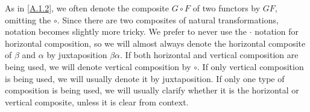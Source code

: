 \begin{notation}\label{A.1.12}
    As in \cref{A.1.2}, we often denote the composite $G\circ F$ of two functors by $GF$, omitting the $\circ$. Since there are two composites of natural transformations, notation becomes slightly more tricky. We prefer to never use the $\cdot$ notation for horizontal composition, so we will almost always denote the horizontal composite of $\beta$ and $\alpha$ by juxtaposition $\beta\alpha$. If both horizontal and vertical composition are being used, we will denote vertical composition by $\circ$. If only vertical composition is being used, we will usually denote it by juxtaposition. If only one type of composition is being used, we will usually clarify whether it is the horizontal or vertical composite, unless it is clear from context.
\end{notation}


